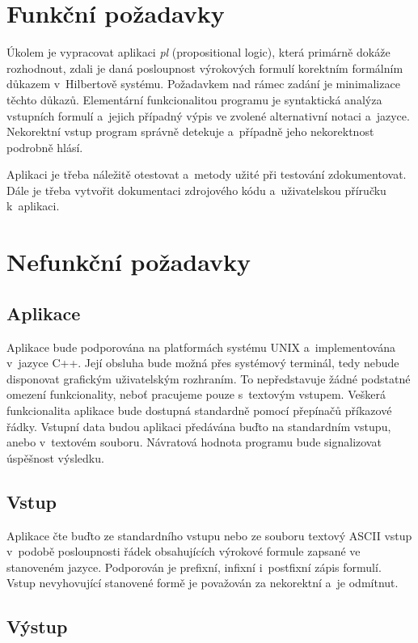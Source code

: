 \documentclass[thesis=B,czech,hidelinks]{thesis}[2012/06/26]
\begin{document}
\section{Funkční požadavky}

Úkolem je vypracovat aplikaci \emph{pl} (propositional logic), která primárně dokáže rozhodnout, zdali je daná posloupnost výrokových formulí korektním formálním důkazem v~Hilbertově systému. Požadavkem nad rámec zadání je minimalizace těchto důkazů. Elementární funkcionalitou programu je syntaktická analýza vstupních formulí a~jejich případný výpis ve zvolené alternativní notaci a~jazyce. Nekorektní vstup program správně detekuje a~případně jeho nekorektnost podrobně hlásí.

Aplikaci je třeba náležitě otestovat a~metody užité při testování zdokumentovat. Dále je třeba vytvořit dokumentaci zdrojového kódu a~uživatelskou příručku k~aplikaci.

\section{Nefunkční požadavky}

\subsection{Aplikace}

Aplikace bude podporována na platformách systému UNIX a~implementována v~jazyce C++. Její obsluha bude možná přes systémový terminál, tedy nebude disponovat grafickým uživatelským rozhraním. To nepředstavuje žádné podstatné omezení funkcionality, neboť pracujeme pouze s~textovým vstupem. Veškerá funkcionalita aplikace bude dostupná standardně pomocí přepínačů příkazové řádky. Vstupní data budou aplikaci předávána buďto na standardním vstupu, anebo v~textovém souboru. Návratová hodnota programu bude signalizovat úspěšnost výsledku.

\subsection{Vstup}

Aplikace čte buďto ze standardního vstupu nebo ze souboru textový ASCII vstup v~podobě posloupnosti řádek obsahujících výrokové formule zapsané ve stanoveném jazyce. Podporován je prefixní, infixní i~postfixní zápis formulí. Vstup nevyhovující stanovené formě je považován za nekorektní a~je odmítnut.

\subsection{Výstup}
\end{document}
